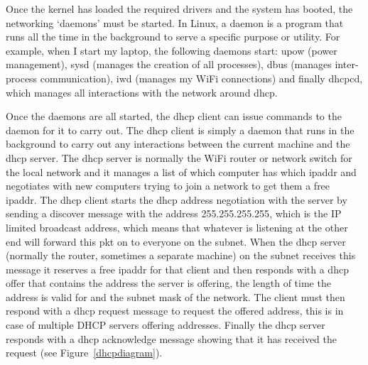 \documentclass[titlepage]{article}
\begin{document}
Once the \gls{kernel} has loaded the required \glspl{driver} and the system has booted, the 
networking `\glspl{daemon}' must be started. In Linux, a \gls{daemon} is a program that runs all the 
time in the background to serve a specific purpose or utility\cite{wiki:daemon}. For example, when I start my laptop,
the following \glspl{daemon} start: \gls{upow} (power management\cite{wiki:upowerd}), \gls{sysd} (manages the creation 
of all processes\cite{wiki:systemd}), \gls{dbus} (manages inter-process communication\cite{wiki:dbus}), iwd (manages my WiFi 
connections\cite{archwiki:iwd}) and finally \gls{dhcpcd}, which manages all interactions with the network around 
\gls{dhcp}\cite{archwiki:dhcpcd}.

Once the \glspl{daemon} are all started, the \gls{dhcp} client can issue commands to the 
daemon for it to carry out. The \gls{dhcp} client is simply a daemon that runs in the background to 
carry out any interactions between the current machine and the \gls{dhcp} server. The \gls{dhcp} 
server is normally the WiFi router or network switch for the local network and it manages a list of 
which computer has which \gls{ipaddr} and negotiates with new computers trying to join a network to 
get them a free \gls{ipaddr}. The \gls{dhcp} client starts the \gls{dhcp} address negotiation with 
the server by sending a discover message with the address 255.255.255.255\cite{wiki:dhcp}, which is the IP limited 
broadcast address\cite{wiki:ipaddresses}, which means that whatever is listening at the other end will forward this 
\gls{pkt} on to everyone on the \gls{subnet}. When the \gls{dhcp} \gls{server} (normally the router, 
sometimes a separate machine) on the subnet receives this message it reserves a free \gls{ipaddr} 
for that client and then responds with a \gls{dhcp} offer that contains the address the 
\gls{server} is offering, the length of time the address is valid for and the \gls{subnet} mask of 
the network. The client must then respond with a \gls{dhcp} request message to request the offered 
address, this is in case of multiple DHCP servers offering addresses. Finally the \gls{dhcp} server 
responds with a \gls{dhcp} acknowledge message showing that it has received the request
(see Figure~\ref{dhcpdiagram}).
\end{document}
